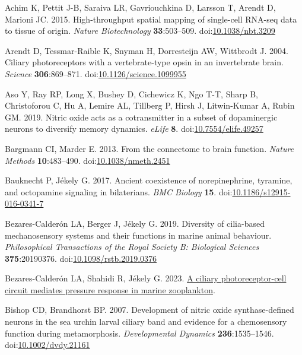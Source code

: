 \documentclass[
  11pt,
  letterpaper,
  DIV=11,
  numbers=noendperiod]{scrartcl}
\newlength{\cslhangindent}
\newenvironment{CSLReferences}[2] %
 {\begin{list}{}{%
  \setlength{\itemindent}{0pt}
  \setlength{\leftmargin}{0pt}
  \setlength{\parsep}{0pt}
  \ifodd #1
   \setlength{\leftmargin}{\cslhangindent}
   \setlength{\itemindent}{-1\cslhangindent}
  \fi
  \setlength{\itemsep}{#2\baselineskip}}}
 {\end{list}}
\begin{document}
\protect{}\label{refs}
\begin{CSLReferences}{1}{0}
Achim K, Pettit J-B, Saraiva LR, Gavriouchkina D, Larsson T, Arendt D,
Marioni JC. 2015. High-throughput spatial mapping of single-cell RNA-seq
data to tissue of origin. \emph{Nature Biotechnology}
\textbf{33}:503--509.
doi:\href{https://doi.org/10.1038/nbt.3209}{10.1038/nbt.3209}

Arendt D, Tessmar-Raible K, Snyman H, Dorresteijn AW, Wittbrodt J. 2004.
Ciliary photoreceptors with a vertebrate-type opsin in an invertebrate
brain. \emph{Science} \textbf{306}:869--871.
doi:\href{https://doi.org/10.1126/science.1099955}{10.1126/science.1099955}

Aso Y, Ray RP, Long X, Bushey D, Cichewicz K, Ngo T-T, Sharp B,
Christoforou C, Hu A, Lemire AL, Tillberg P, Hirsh J, Litwin-Kumar A,
Rubin GM. 2019. Nitric oxide acts as a cotransmitter in a subset of
dopaminergic neurons to diversify memory dynamics. \emph{eLife}
\textbf{8}.
doi:\href{https://doi.org/10.7554/elife.49257}{10.7554/elife.49257}

Bargmann CI, Marder E. 2013. From the connectome to brain function.
\emph{Nature Methods} \textbf{10}:483--490.
doi:\href{https://doi.org/10.1038/nmeth.2451}{10.1038/nmeth.2451}

Bauknecht P, Jékely G. 2017. Ancient coexistence of norepinephrine,
tyramine, and octopamine signaling in bilaterians. \emph{BMC Biology}
\textbf{15}.
doi:\href{https://doi.org/10.1186/s12915-016-0341-7}{10.1186/s12915-016-0341-7}

Bezares-Calderón LA, Berger J, Jékely G. 2019. Diversity of cilia-based
mechanosensory systems and their functions in marine animal behaviour.
\emph{Philosophical Transactions of the Royal Society B: Biological
Sciences} \textbf{375}:20190376.
doi:\href{https://doi.org/10.1098/rstb.2019.0376}{10.1098/rstb.2019.0376}

Bezares-Calderón LA, Shahidi R, Jékely G. 2023.
\href{http://dx.doi.org/10.1101/2023.02.28.530398}{A ciliary
photoreceptor-cell circuit mediates pressure response in marine
zooplankton}.

Bishop CD, Brandhorst BP. 2007. Development of nitric oxide
synthase-defined neurons in the sea urchin larval ciliary band and
evidence for a chemosensory function during metamorphosis.
\emph{Developmental Dynamics} \textbf{236}:1535--1546.
doi:\href{https://doi.org/10.1002/dvdy.21161}{10.1002/dvdy.21161}


\end{CSLReferences}
\end{document}
